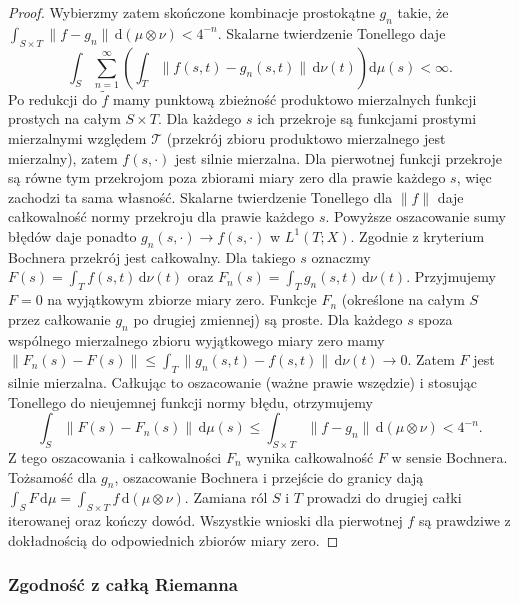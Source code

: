 \begin{proof}
Wybierzmy zatem skończone kombinacje prostokątne $g_n$
takie, że
$\int_{S\times T}\|f-g_n\|\,\mathrm d(\mu\otimes\nu)<4^{-n}$.
Skalarne twierdzenie Tonellego daje
\[
 \int_S\sum_{n=1}^\infty
 \left(\int_T\|f(s,t)-g_n(s,t)\|\,\mathrm d\nu(t)\right)
 \mathrm d\mu(s)<\infty.
\]
Po redukcji do $\widetilde f$ mamy punktową zbieżność
produktowo mierzalnych funkcji prostych na całym $S\times T$.
Dla każdego $s$ ich przekroje są funkcjami prostymi
mierzalnymi względem $\mathcal T$ (przekrój zbioru
produktowo mierzalnego jest mierzalny), zatem $f(s,\cdot)$
jest silnie mierzalna. Dla pierwotnej funkcji przekroje
są równe tym przekrojom poza zbiorami miary zero
dla prawie każdego $s$, więc zachodzi ta sama własność.
Skalarne twierdzenie Tonellego dla $\|f\|$ daje całkowalność
normy przekroju dla prawie każdego $s$. Powyższe oszacowanie
sumy błędów daje ponadto $g_n(s,\cdot)\to f(s,\cdot)$
w $L^1(T;X)$.
Zgodnie z kryterium Bochnera przekrój jest całkowalny.
Dla takiego $s$ oznaczmy
$F(s)=\int_T f(s,t)\,\mathrm d\nu(t)$ oraz
$F_n(s)=\int_T g_n(s,t)\,\mathrm d\nu(t)$.
Przyjmujemy $F=0$ na wyjątkowym zbiorze miary zero.
Funkcje $F_n$ (określone na całym $S$ przez całkowanie
$g_n$ po drugiej zmiennej) są proste. Dla każdego $s$
spoza wspólnego mierzalnego zbioru wyjątkowego miary zero
mamy $\|F_n(s)-F(s)\|\le\int_T\|g_n(s,t)-f(s,t)\|\,\mathrm d\nu(t)
\to0$. Zatem $F$ jest silnie mierzalna. Całkując
to oszacowanie (ważne prawie wszędzie) i stosując Tonellego
do nieujemnej funkcji normy błędu, otrzymujemy
\[
 \int_S\|F(s)-F_n(s)\|\,\mathrm d\mu(s)
 \le\int_{S\times T}\|f-g_n\|\,\mathrm d(\mu\otimes\nu)
 <4^{-n}.
\]
Z tego oszacowania i całkowalności $F_n$ wynika całkowalność
$F$ w sensie Bochnera.
Tożsamość dla $g_n$, oszacowanie Bochnera i przejście
do granicy dają
$\int_S F\,\mathrm d\mu
 =\int_{S\times T}f\,\mathrm d(\mu\otimes\nu)$.
Zamiana ról $S$ i $T$ prowadzi do drugiej całki iterowanej
oraz kończy dowód. Wszystkie wnioski dla pierwotnej $f$
są prawdziwe z dokładnością do odpowiednich zbiorów
miary zero.
\end{proof}

\subsubsection{Zgodność z całką Riemanna}


